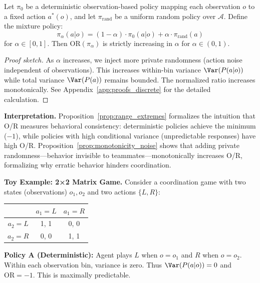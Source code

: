 \begin{proposition}
\label{prop:monotonicity_noise}
Let $\pi_0$ be a deterministic observation-based policy mapping each observation $o$ to a fixed action $a^*(o)$, and let $\pi_{\mathrm{rand}}$ be a uniform random policy over $\mathcal{A}$. Define the mixture policy:
\begin{equation}
\pi_\alpha(a|o) = (1-\alpha) \cdot \pi_0(a|o) + \alpha \cdot \pi_{\mathrm{rand}}(a)
\end{equation}
for $\alpha \in [0, 1]$. Then $\mathrm{OR}(\pi_\alpha)$ is strictly increasing in $\alpha$ for $\alpha \in (0, 1)$.
\end{proposition}

\begin{proof}[Proof sketch]
As $\alpha$ increases, we inject more private randomness (action noise independent of observations). This increases within-bin variance $\Var(P(a|o))$ while total variance $\Var(P(a))$ remains bounded. The normalized ratio increases monotonically. See Appendix~\ref{app:proofs_discrete} for the detailed calculation.
\end{proof}

\textbf{Interpretation.} Proposition~\ref{prop:range_extremes} formalizes the intuition that O/R measures behavioral consistency: deterministic policies achieve the minimum ($-1$), while policies with high conditional variance (unpredictable responses) have high O/R. Proposition~\ref{prop:monotonicity_noise} shows that adding private randomness—behavior invisible to teammates—monotonically increases O/R, formalizing why erratic behavior hinders coordination.

\textbf{Toy Example: 2×2 Matrix Game.} Consider a coordination game with two states (observations) $o_1, o_2$ and two actions $\{L, R\}$:
\begin{center}
\begin{tabular}{c|cc}
& $a_1 = L$ & $a_1 = R$ \\
\hline
$a_2 = L$ & 1, 1 & 0, 0 \\
$a_2 = R$ & 0, 0 & 1, 1 \\
\end{tabular}
\end{center}

\textbf{Policy A (Deterministic):} Agent plays $L$ when $o = o_1$ and $R$ when $o = o_2$. Within each observation bin, variance is zero. Thus $\Var(P(a|o)) = 0$ and $\mathrm{OR} = -1$. This is maximally predictable.

